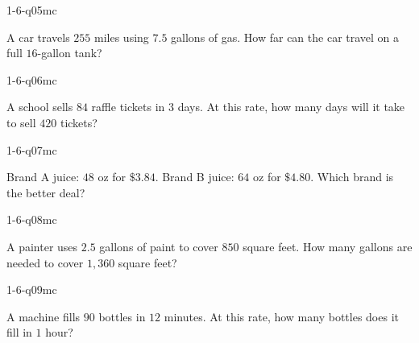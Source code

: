 \begin{practiceQuestion}{1-6-q05}{mc}
\begin{questionText}
A car travels $255$ miles using $7.5$ gallons of gas. How far can the car travel on a full $16$-gallon tank?
\end{questionText}
\end{practiceQuestion}

\begin{practiceQuestion}{1-6-q06}{mc}
\begin{questionText}
A school sells $84$ raffle tickets in $3$ days. At this rate, how many days will it take to sell $420$ tickets?
\end{questionText}
\end{practiceQuestion}

\begin{practiceQuestion}{1-6-q07}{mc}
\begin{questionText}
Brand A juice: $48$ oz for $\$3.84$. Brand B juice: $64$ oz for $\$4.80$. Which brand is the better deal?
\end{questionText}
\end{practiceQuestion}

\begin{practiceQuestion}{1-6-q08}{mc}
\begin{questionText}
A painter uses $2.5$ gallons of paint to cover $850$ square feet. How many gallons are needed to cover $1{,}360$ square feet?
\end{questionText}
\end{practiceQuestion}

\begin{practiceQuestion}{1-6-q09}{mc}
\begin{questionText}
A machine fills $90$ bottles in $12$ minutes. At this rate, how many bottles does it fill in $1$ hour?
\end{questionText}
\end{practiceQuestion}

